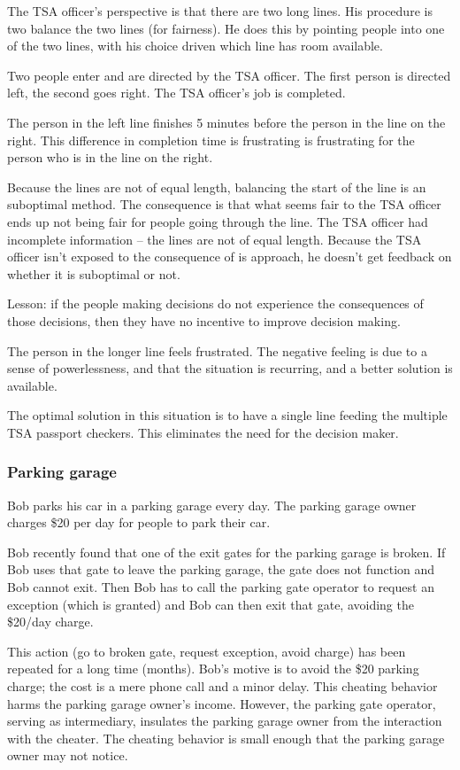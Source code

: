 The TSA officer's perspective is that there are two long lines. His procedure is two balance the two lines (for fairness). He does this by pointing people into one of the two lines, with his choice driven which line has room available.

Two people enter and are directed by the TSA officer. The first person is directed left, the second goes right. The TSA officer's job is completed.

The person in the left line finishes 5 minutes before the person in the line on the right. This difference in completion time is frustrating is frustrating for the person who is in the line on the right.

Because the lines are not of equal length, balancing the start of the line is an suboptimal method. The consequence is that what seems fair to the TSA officer ends up not being fair for people going through the line. The TSA officer had incomplete information -- the lines are not of equal length. Because the TSA officer isn't exposed to the consequence of is approach, he doesn't get feedback on whether it is suboptimal or not.

Lesson: if the people making decisions do not experience the consequences of those decisions, then they have no incentive to improve decision making.

The person in the longer line feels frustrated. The negative feeling is due to a sense of powerlessness, and that the situation is recurring, and a better solution is available.

The optimal solution in this situation is to have a single line feeding the multiple TSA passport checkers. This eliminates the need for the decision maker.


\subsubsection{Parking garage}
Bob parks his car in a parking garage every day. 
The parking garage owner charges \$20 per day for people to park their car.

Bob recently found that one of the exit gates for the parking garage is broken. If Bob uses that gate to leave the parking garage, the gate does not function and Bob cannot exit. Then Bob has to call the parking gate operator to request an exception (which is granted) and Bob can then exit that gate, avoiding the \$20/day charge.

This action (go to broken gate, request exception, avoid charge) has been repeated for a long time (months). Bob's motive is to avoid the \$20 parking charge; the cost is a mere phone call and a minor delay. This cheating behavior harms the parking garage owner's income. However, the parking gate operator, serving as intermediary, insulates the parking garage owner from the interaction with the cheater. The cheating behavior is small enough that the parking garage owner may not notice.

